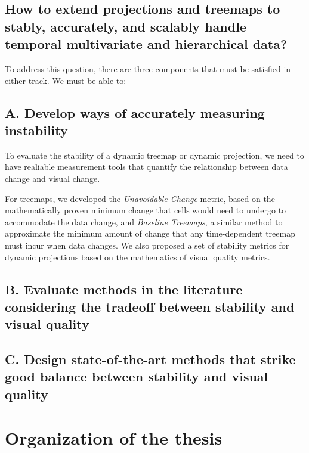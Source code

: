 \subsection*{How to extend projections and treemaps to stably, accurately, and scalably handle temporal multivariate and hierarchical data?}

To address this question, there are three components that must be satisfied in either track. We must be able to:

\subsection*{A. Develop ways of accurately measuring instability}

To evaluate the stability of a dynamic treemap or dynamic projection, we need to have realiable measurement tools that quantify the relationship between data change and visual change.

For treemaps, we developed the \emph{Unavoidable Change} metric, based on the mathematically proven minimum change that cells would need to undergo to accommodate the data change, and \emph{Baseline Treemaps}, a similar method to approximate the minimum amount of change that any time-dependent treemap must incur when data changes.
We also proposed a set of stability metrics for dynamic projections based on the mathematics of visual quality metrics.  


\subsection*{B. Evaluate methods in the literature considering the tradeoff between stability and visual quality}


\subsection*{C. Design state-of-the-art methods that strike good balance between stability and visual quality}


\section{Organization of the thesis}






